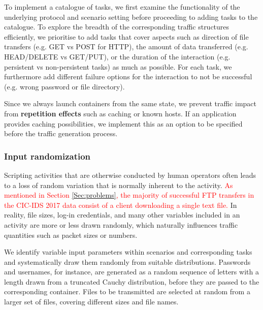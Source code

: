 \documentclass[runningheads]{llncs}
\begin{document}
To implement a catalogue of tasks, we first examine the functionality of the underlying protocol and scenario setting before proceeding to adding tasks to the catalogue. To explore the breadth of the corresponding traffic structures efficiently, we prioritise to add tasks that cover aspects such as direction of file transfers (e.g. GET vs POST for HTTP), the amount of data transferred (e.g. HEAD/DELETE vs GET/PUT), or the duration of the interaction (e.g. persistent vs non-persistent tasks) as much as possible. For each task, we furthermore add different failure options for the interaction to not be successful (e.g. wrong password or file directory). 

Since we always launch containers from the same state, we prevent traffic impact from \textbf{repetition effects} such as caching or known hosts. If an application provides caching possibilities, we implement this as an option to be specified before the traffic generation process.



\subsubsection*{Input randomization}\label{Sec:randomsubscen}

Scripting activities that are otherwise conducted by human operators often leads to a loss of random variation that is normally inherent to the activity.
\textcolor{red}{As mentioned in Section \ref{Sec:problems}, the majority of successful FTP transfers in the CIC-IDS 2017 data consist of a client downloading a single text file.} In reality, file sizes, log-in credentials, and many other variables included in an activity are more or less drawn randomly, which naturally influences traffic quantities such as packet sizes or numbers.

We identify variable input parameters within scenarios and corresponding tasks and systematically draw them randomly from suitable distributions. Passwords and usernames, for instance, are generated as a random sequence of letters with a length drawn from a truncated Cauchy distribution, before they are passed to the corresponding container. Files to be transmitted are selected at random from a larger set of files, covering different sizes and file names.
\end{document}
